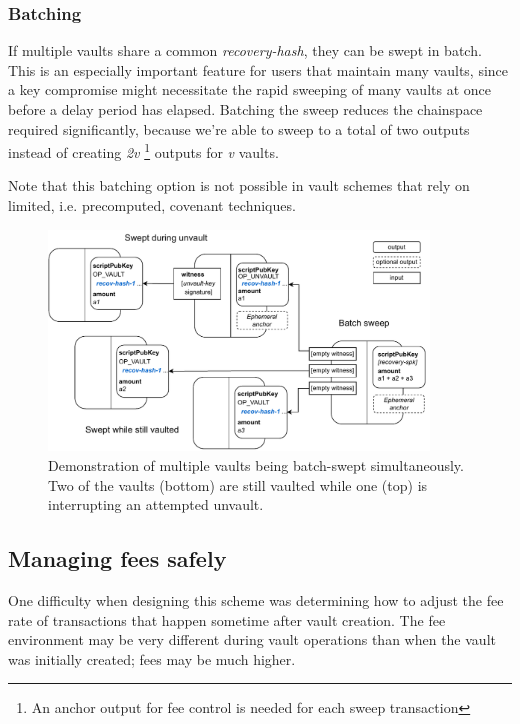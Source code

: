 \documentclass[10pt]{article}
\begin{document}
\subsubsection*{Batching}

If multiple vaults share a common \emph{recovery-hash}, they can be swept in batch.
This is an especially important feature for users that maintain many vaults, since a key
compromise might necessitate the rapid sweeping of many vaults at once before a delay
period has elapsed. Batching the sweep reduces the chainspace required significantly,
because we're able to sweep to a total of two outputs instead of
creating \emph{2v} \footnote{An anchor output for fee control
is needed for each sweep transaction} 
outputs for \emph{v} vaults.

Note that this batching option is not possible in vault schemes that rely on limited,
i.e. precomputed, covenant techniques.

\begin{figure}[H]
\includegraphics[width=0.9\textwidth]{batch-sweep.pdf}
\centering
\caption{Demonstration of multiple vaults being batch-swept simultaneously. Two of
  the vaults (bottom) are still vaulted while one (top) is interrupting an attempted unvault.}
\end{figure}

\subsection*{Managing fees safely}

One difficulty when designing this scheme was determining how to adjust the fee rate of
transactions that happen sometime after vault creation. The fee environment may be very
different during vault operations than when the vault was initially created; fees may
be much higher. 
\end{document}
